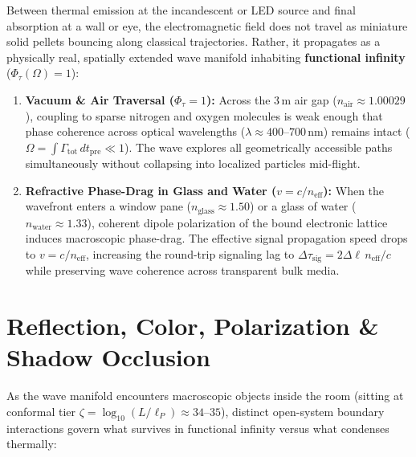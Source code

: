 \documentclass[11pt,a4paper]{article}
\begin{document}
Between thermal emission at the incandescent or LED source and final absorption at a wall or eye, the electromagnetic field does not travel as miniature solid pellets bouncing along classical trajectories. Rather, it propagates as a physically real, spatially extended wave manifold inhabiting \textbf{functional infinity} ($\Phi_\tau(\Omega) = 1$):

\begin{enumerate}
    \item \textbf{Vacuum \& Air Traversal ($\Phi_\tau = 1$):} Across the $3\,\mathrm{m}$ air gap ($n_{\mathrm{air}} \approx 1.00029$), coupling to sparse nitrogen and oxygen molecules is weak enough that phase coherence across optical wavelengths ($\lambda \approx 400\text{--}700\,\mathrm{nm}$) remains intact ($\Omega = \int \Gamma_{\mathrm{tot}}\,dt_{\mathrm{pre}} \ll 1$). The wave explores all geometrically accessible paths simultaneously without collapsing into localized particles mid-flight.
    \item \textbf{Refractive Phase-Drag in Glass and Water ($v = c / n_{\mathrm{eff}}$):} When the wavefront enters a window pane ($n_{\mathrm{glass}} \approx 1.50$) or a glass of water ($n_{\mathrm{water}} \approx 1.33$), coherent dipole polarization of the bound electronic lattice induces macroscopic phase-drag. The effective signal propagation speed drops to $v = c / n_{\mathrm{eff}}$, increasing the round-trip signaling lag to $\Delta\tau_{\mathrm{sig}} = 2\Delta\ell\,n_{\mathrm{eff}} / c$ while preserving wave coherence across transparent bulk media.
\end{enumerate}

\section{Reflection, Color, Polarization \& Shadow Occlusion}

As the wave manifold encounters macroscopic objects inside the room (sitting at conformal tier $\zeta = \log_{10}(L / \ell_P) \approx 34\text{--}35$), distinct open-system boundary interactions govern what survives in functional infinity versus what condenses thermally:
\end{document}
